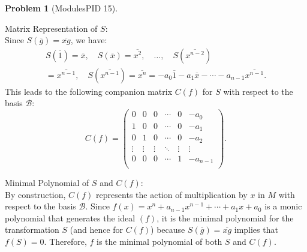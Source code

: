 \documentclass[12pt]{article}
\theoremstyle{definition}
\newtheorem{problem}{Problem}
\begin{document}
\begin{problem} [ModulesPID 15]
\begin{solution}
        Matrix Representation of \( S \): \\ 
        Since \( S(\overline{g}) = \overline{xg} \), we have:
        \begin{align*}
            S(\overline{1}) = \overline{x}, \quad S(\overline{x}) = \overline{x^2}, \quad \ldots, \quad S(\overline{x^{n-2}}) \\
            = \overline{x^{n-1}}, \quad S(\overline{x^{n-1}}) = \overline{x^n} = -a_0 \overline{1} - a_1 \overline{x} - \cdots - a_{n-1} \overline{x^{n-1}}.
        \end{align*}
        This leads to the following companion matrix \( C(f) \) for \( S \) with respect to the basis \( \mathcal{B} \):
        \[
        C(f) = 
        \begin{pmatrix}
            0 & 0 & 0 & \cdots & 0 & -a_0 \\
            1 & 0 & 0 & \cdots & 0 & -a_1 \\
            0 & 1 & 0 & \cdots & 0 & -a_2 \\
            \vdots & \vdots & \vdots & \ddots & \vdots & \vdots \\
            0 & 0 & 0 & \cdots & 1 & -a_{n-1} \\
        \end{pmatrix}.
        \]

        Minimal Polynomial of \( S \) and \( C(f) \): \\ 
        By construction, \( C(f) \) represents the action of multiplication by \( x \) in \( M \) with respect to the basis \( \mathcal{B} \). Since \( f(x) = x^n + a_{n-1} x^{n-1} + \cdots + a_1 x + a_0 \) is a monic polynomial that generates the ideal \( (f) \), it is the minimal polynomial for the transformation \( S \) (and hence for \( C(f) \)) because \( S(\overline{g}) = \overline{xg} \) implies that \( f(S) = 0 \). Therefore, \( f \) is the minimal polynomial of both \( S \) and \( C(f) \).


    \end{solution}
\end{problem}
\end{document}
